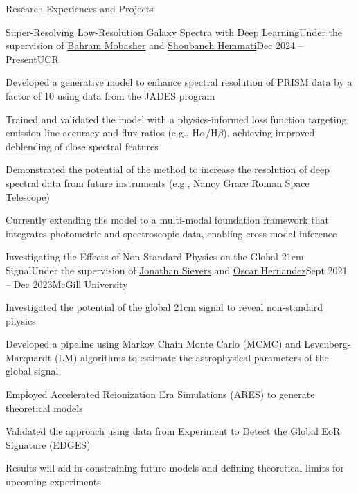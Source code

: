 \documentclass[]{kyvernitis-resume}
\begin{document}
\begin{section}{Research Experiences and Projects}

\begin{subsection}{Super-Resolving Low-Resolution Galaxy Spectra with Deep Learning}{Under the supervision of \href{https://faculty.ucr.edu/~mobasher/}{Bahram Mobasher} and \href{https://www.ipac.caltech.edu/meet-the-staff/shoubaneh-hemmati}{Shoubaneh Hemmati}}{Dec 2024 -- Present}{UCR}
    \item Developed a generative model to enhance spectral resolution of PRISM data by a factor of 10 using data from the JADES program
    \item Trained and validated the model with a physics-informed loss function targeting emission line accuracy and flux ratios (e.g., H$\alpha$/H$\beta$), achieving improved deblending of close spectral features
    \item Demonstrated the potential of the method to increase the resolution of deep spectral data from future instruments (e.g., Nancy Grace Roman Space Telescope)
    \item Currently extending the model to a multi-modal foundation framework that integrates photometric and spectroscopic data, enabling cross-modal inference
\end{subsection}

\begin{subsection}{Investigating the Effects of Non-Standard Physics on the Global 21cm Signal}{Under the supervision of \href{https://www.physics.mcgill.ca/~sievers/}{Jonathan Sievers} and \href{https://www.physics.mcgill.ca/~oscarh/}{Oscar Hernandez}}{Sept 2021 -- Dec 2023}{McGill University}
    \item Investigated the potential of the global 21cm signal to reveal non-standard physics
    \item Developed a pipeline using Markov Chain Monte Carlo (MCMC) and Levenberg-Marquardt (LM) algorithms to estimate the astrophysical parameters of the global signal
    \item Employed Accelerated Reionization Era Simulations (ARES) to generate theoretical models
    \item Validated the approach using data from Experiment to Detect the Global EoR Signature (EDGES)
    \item Results will aid in constraining future models and defining theoretical limits for upcoming experiments
\end{subsection}


\end{section}
\end{document}
